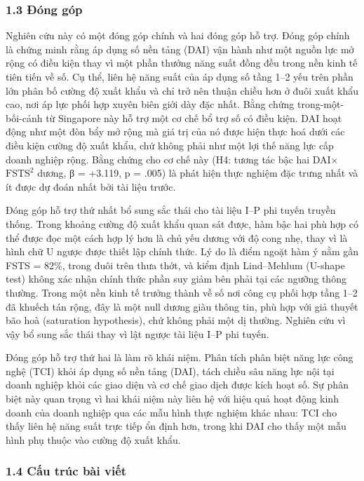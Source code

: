 \documentclass[12pt,a4paper]{article}
\begin{document}
\hypertarget{13-ux111uxf3ng-guxf3p}{%
\subsubsection{1.3 Đóng góp}\label{13-ux111uxf3ng-guxf3p}}

Nghiên cứu này có một đóng góp chính và hai đóng góp hỗ trợ. Đóng góp
chính là chứng minh rằng áp dụng số nền tảng (DAI) vận hành như một
nguồn lực mở rộng có điều kiện thay vì một phần thưởng năng suất đồng
đều trong nền kinh tế tiên tiến về số. Cụ thể, liên hệ năng suất của áp
dụng số tầng 1--2 yếu trên phần lớn phân bố cường độ xuất khẩu và chỉ
trở nên thuận chiều hơn ở đuôi xuất khẩu cao, nơi áp lực phối hợp xuyên
biên giới dày đặc nhất. Bằng chứng trong-một-bối-cảnh từ Singapore này
hỗ trợ một cơ chế bổ trợ số có điều kiện. DAI hoạt động như một đòn bẩy
mở rộng mà giá trị của nó được hiện thực hoá dưới các điều kiện cường độ
xuất khẩu, chứ không phải như một lợi thế năng lực cấp doanh nghiệp
rộng. Bằng chứng cho cơ chế này (H4: tương tác bậc hai
DAI×\(\mathrm{FSTS}^2\) dương, β = +3.119, p = .005) là phát hiện thực
nghiệm đặc trưng nhất và ít được dự đoán nhất bởi tài liệu trước.

Đóng góp hỗ trợ thứ nhất bổ sung sắc thái cho tài liệu I--P phi tuyến
truyền thống. Trong khoảng cường độ xuất khẩu quan sát được, hàm bậc hai
phù hợp có thể được đọc một cách hợp lý hơn là chủ yếu dương với độ cong
nhẹ, thay vì là hình chữ U ngược được thiết lập chính thức. Lý do là
điểm ngoặt hàm ý nằm gần FSTS = 82\%, trong đuôi trên thưa thớt, và kiểm
định Lind--Mehlum (U-shape test) không xác nhận chính thức phần suy giảm
bên phải tại các ngưỡng thông thường. Trong một nền kinh tế trưởng thành
về số nơi công cụ phối hợp tầng 1--2 đã khuếch tán rộng, đây là một null
dương giàu thông tin, phù hợp với giả thuyết bão hoà (saturation
hypothesis), chứ không phải một dị thường. Nghiên cứu vì vậy bổ sung sắc
thái thay vì lật ngược tài liệu I--P phi tuyến.

Đóng góp hỗ trợ thứ hai là làm rõ khái niệm. Phân tích phân biệt năng
lực công nghệ (TCI) khỏi áp dụng số nền tảng (DAI), tách chiều sâu năng
lực nội tại doanh nghiệp khỏi các giao diện và cơ chế giao dịch được
kích hoạt số. Sự phân biệt này quan trọng vì hai khái niệm này liên hệ
với hiệu quả hoạt động kinh doanh của doanh nghiệp qua các mẫu hình thực
nghiệm khác nhau: TCI cho thấy liên hệ năng suất trực tiếp ổn định hơn,
trong khi DAI cho thấy một mẫu hình phụ thuộc vào cường độ xuất khẩu.

\hypertarget{14-cux1ea5u-truxfac-buxe0i-viux1ebft}{%
\subsubsection{1.4 Cấu trúc bài
viết}\label{14-cux1ea5u-truxfac-buxe0i-viux1ebft}}
\end{document}
